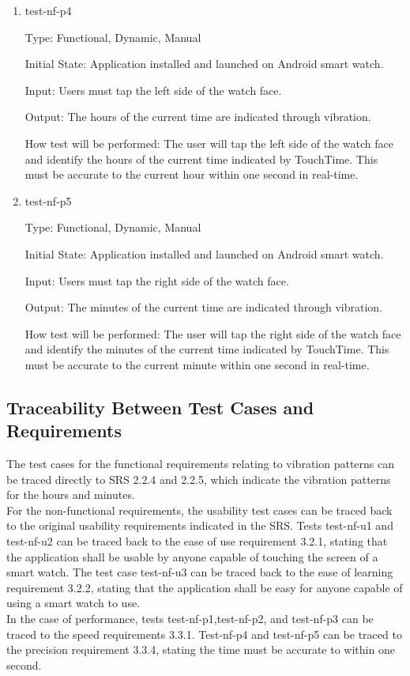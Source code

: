 \begin{enumerate}
\item{test-nf-p4\\}

Type: Functional, Dynamic, Manual
					
Initial State: Application installed and launched on Android smart watch. 
					
Input: Users must tap the left side of the watch face.
					
Output: The hours of the current time are indicated through vibration.
					
How test will be performed: The user will tap the left side of the watch face and identify the hours of the current time indicated by TouchTime. This must be accurate to the current hour within one second in real-time.

\item{test-nf-p5\\}

Type: Functional, Dynamic, Manual
					
Initial State: Application installed and launched on Android smart watch. 
					
Input: Users must tap the right side of the watch face.
					
Output: The minutes of the current time are indicated through vibration.
					
How test will be performed: The user will tap the right side of the watch face and identify the minutes of the current time indicated by TouchTime. This must be accurate to the current minute within one second in real-time.

\end{enumerate}


\subsection{Traceability Between Test Cases and Requirements}
The test cases for the functional requirements relating to vibration patterns can be traced directly to SRS 2.2.4 and 2.2.5, which indicate the vibration patterns for the hours and minutes.\\
\newline
For the non-functional requirements, the usability test cases can be traced back to the original usability requirements indicated in the SRS. Tests test-nf-u1 and test-nf-u2 can be traced back to the ease of use requirement 3.2.1, stating that the application shall be usable by anyone capable of touching the screen of a smart watch. The test case test-nf-u3 can be traced back to the ease of learning requirement 3.2.2, stating that the application shall be easy for anyone capable of using a smart watch to use. \\
\newline
In the case of performance, tests test-nf-p1,test-nf-p2, and test-nf-p3 can be traced to the speed requirements 3.3.1. Test-nf-p4 and test-nf-p5 can be traced to the precision requirement 3.3.4, stating the time must be accurate to within one second.

